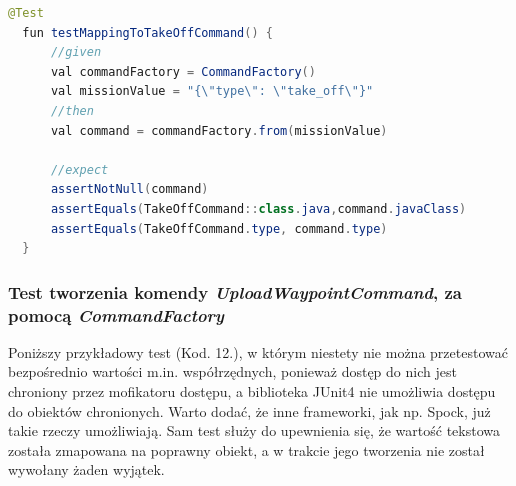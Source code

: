\begin{lstlisting}[language=Java, caption=Test tworzenia komendy \textit{TakeOffCommand}\, za pomocą \textit{CommandFactory}]
  @Test
  fun testMappingToTakeOffCommand() {
      //given
      val commandFactory = CommandFactory()
      val missionValue = "{\"type\": \"take_off\"}"
      //then
      val command = commandFactory.from(missionValue)

      //expect
      assertNotNull(command)
      assertEquals(TakeOffCommand::class.java,command.javaClass)
      assertEquals(TakeOffCommand.type, command.type)
  }
\end{lstlisting}



\newpage
\subsubsection{Test tworzenia komendy \textit{UploadWaypointCommand}, za pomocą \textit{CommandFactory}}
Poniższy przykładowy test (Kod. 12.), w którym niestety nie można przetestować bezpośrednio wartości m.in. współrzędnych, ponieważ dostęp do nich jest chroniony przez mofikatoru dostępu, a biblioteka JUnit4 nie umożliwia dostępu do obiektów chronionych. Warto dodać, że inne frameworki, jak np. Spock, już takie rzeczy umożliwiają. Sam test służy do upewnienia się, że wartość tekstowa została zmapowana na poprawny obiekt, a w trakcie jego tworzenia nie został wywołany żaden wyjątek.

